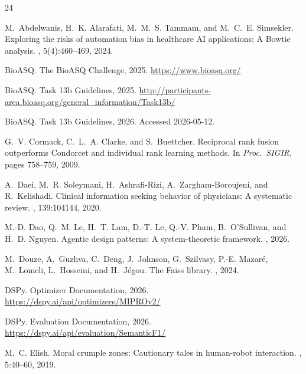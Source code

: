 \documentclass[sigconf,anonymous,review]{acmart}
\begin{document}

\begin{thebibliography}{24}

M.~Abdelwanis, H.~K. Alarafati, M.~M.~S. Tammam, and M.~C.~E. Simsekler.
\newblock Exploring the risks of automation bias in healthcare AI applications: A Bowtie analysis.
, 5(4):460--469, 2024.

BioASQ.
\newblock The {BioASQ} Challenge, 2025.
\newblock \url{https://www.bioasq.org/}

BioASQ.
 Task 13b Guidelines, 2025.
\newblock \url{http://participants-area.bioasq.org/general_information/Task13b/}

BioASQ.
 Task 13b Guidelines, 2026.
\newblock Accessed 2026-05-12.

G.~V. Cormack, C.~L.~A. Clarke, and S.~Buettcher.
\newblock Reciprocal rank fusion outperforms Condorcet and individual rank learning methods.
\newblock In {\em Proc.\ SIGIR}, pages 758--759, 2009.

A.~Daei, M.~R. Soleymani, H.~Ashrafi-Rizi, A.~Zargham-Boroujeni, and R.~Kelishadi.
\newblock Clinical information seeking behavior of physicians: A systematic review.
, 139:104144, 2020.

M.-D. Dao, Q.~M. Le, H.~T. Lam, D.-T. Le, Q.-V. Pham, B.~O'Sullivan, and H.~D. Nguyen.
\newblock Agentic design patterns: A system-theoretic framework.
, 2026.

M.~Douze, A.~Guzhva, C.~Deng, J.~Johnson, G.~Szilvasy, P.-E. Mazar\'{e}, M.~Lomeli, L.~Hosseini, and H.~J\'{e}gou.
\newblock The {Faiss} library.
, 2024.

DSPy.
 Optimizer Documentation, 2026.
\newblock \url{https://dspy.ai/api/optimizers/MIPROv2/}

DSPy.
 Evaluation Documentation, 2026.
\newblock \url{https://dspy.ai/api/evaluation/SemanticF1/}

M.~C. Elish.
\newblock Moral crumple zones: Cautionary tales in human-robot interaction.
, 5:40--60, 2019.


\end{thebibliography}
\end{document}
